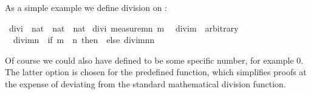 \begin{isabellebody}
\begin{isamarkuptext}
As a simple example we define division on :%
\end{isamarkuptext}%
\isamarkuptrue%
\isamarkupfalse%
\ divi\ {\isacharcolon}{\isacharcolon}\ {\isachardoublequoteopen}nat\ {\isasymtimes}\ nat\ {\isasymRightarrow}\ nat{\isachardoublequoteclose}\isanewline
{}\isamarkupfalse%
\ divi\ {\isachardoublequoteopen}measure{\isacharparenleft}{\isasymlambda}{\isacharparenleft}m{\isacharcomma}n{\isacharparenright}{\isachardot}\ m{\isacharparenright}{\isachardoublequoteclose}\isanewline
\ \ {\isachardoublequoteopen}divi{\isacharparenleft}m{\isacharcomma}{}{\isacharparenright}\ {\isacharequal}\ arbitrary{\isachardoublequoteclose}\isanewline
\ \ {\isachardoublequoteopen}divi{\isacharparenleft}m{\isacharcomma}n{\isacharparenright}\ {\isacharequal}\ {\isacharparenleft}if\ m\ {\isacharless}\ n\ then\ {}\ else\ divi{\isacharparenleft}m{\isacharminus}n{\isacharcomma}n{\isacharparenright}{\isacharplus}{}{\isacharparenright}{\isachardoublequoteclose}%
\begin{isamarkuptext}%
\noindent Of course we could also have defined
 to be some specific number, for example 0. The
latter option is chosen for the predefined  function, which
simplifies proofs at the expense of deviating from the
standard mathematical division function.


\end{isamarkuptext}
\end{isabellebody}
